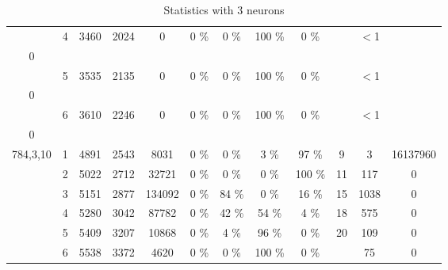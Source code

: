 \begin{table} [!ht]
\begin{tabular}{ ||c||c|c|c|c|c|c|c|c|c|c|c| }
& 4 & 3460 & 2024 & 0 & 0 \% & 0 \% & 100 \% & 0 \% &  & $<$1 \\ 0 \\ 
& 5 & 3535 & 2135 & 0 & 0 \% & 0 \% & 100 \% & 0 \% &  & $<$1 \\ 0 \\ 
& 6 & 3610 & 2246 & 0 & 0 \% & 0 \% & 100 \% & 0 \% &  & $<$1 \\ 0 \\ 
\hline \hline
\multirow{6}{4em}{784,3,10}
& 1 & 4891 & 2543 & 8031 & 0 \% & 0 \% & 3 \% & 97 \% & 9 & 3 & 16137960 \\ 
& 2 & 5022 & 2712 & 32721 & 0 \% & 0 \% & 0 \% & 100 \% & 11 & 117 & 0 \\ 
& 3 & 5151 & 2877 & 134092 & 0 \% & 84 \% & 0 \% & 16 \% & 15 & 1038 & 0 \\ 
& 4 & 5280 & 3042 & 87782 & 0 \% & 42 \% & 54 \% & 4 \% & 18 & 575 & 0 \\ 
& 5 & 5409 & 3207 & 10868 & 0 \% & 4 \% & 96 \% & 0 \% & 20 & 109 & 0 \\ 
& 6 & 5538 & 3372 & 4620 & 0 \% & 0 \% & 100 \% & 0 \% &  & 75 & 0 \\ 
\hline \hline
\end{tabular} \caption{Statistics with 3 neurons}\label{tab:3N-E1} \end{table}
